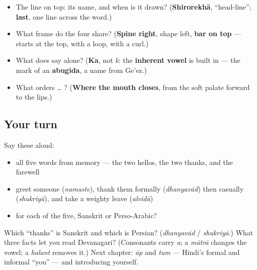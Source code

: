 \begin{itemize}
\raggedright
  \item The line on top: its name, and when is it drawn? (\textbf{Shirorekhā}, \textquotedblleft{}head-line\textquotedblright{}; \textbf{last}, one line across the word.)
  \item What frame do the four share? (\textbf{Spine right}, shape left, \textbf{bar on top} — \textbf{} starts at the top, \textbf{} with a loop, \textbf{} with a curl.)
  \item What does \textbf{} say alone? (\textbf{Ka}, not \emph{k}: the \textbf{inherent vowel} is built in — the mark of an \textbf{abugida}, a name from Ge'ez.)
  \item What orders \textbf{} … \textbf{}? (\textbf{Where the mouth closes}, from the soft palate forward to the lips.)
\end{itemize}

\subsection*{Your turn}
Say these aloud:

\begin{itemize}
\raggedright
  \item all five words from memory — the two hellos, the two thanks, and the farewell
  \item greet someone (\emph{namaste}), thank them formally (\emph{dhanyavād}) then casually (\emph{shukriyā}), and take a weighty leave (\emph{alvidā})
  \item for each of the five, Sanskrit or Perso-Arabic?
\end{itemize}

\begin{tcolorbox}[breakable,colback=teal!4,colframe=teal!35!black,title={Before you move on}]
Which \textquotedblleft{}thanks\textquotedblright{} is Sanskrit and which is Persian? (\emph{dhanyavād} / \emph{shukriyā}.) What three facts let you read Devanagari? (Consonants carry \emph{a}; a \emph{mātrā} changes the vowel; a \emph{halant} removes it.) Next chapter: \emph{āp} and \emph{tum} — Hindi's formal and informal \textquotedblleft{}you\textquotedblright{} — and introducing yourself.
\end{tcolorbox}
